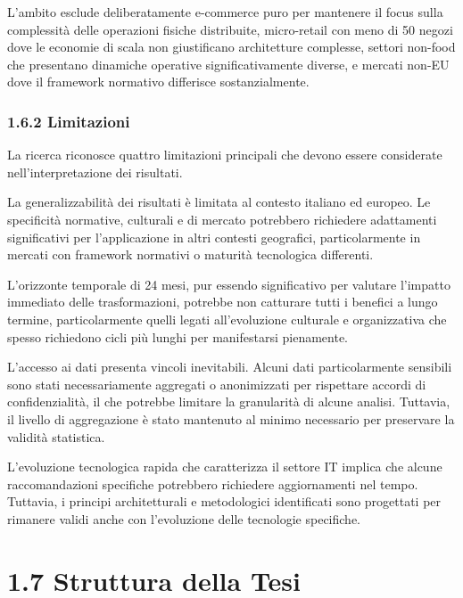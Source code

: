 \documentclass{report}
\begin{document}
L'ambito esclude deliberatamente e-commerce puro per mantenere il focus
sulla complessità delle operazioni fisiche distribuite, micro-retail con
meno di 50 negozi dove le economie di scala non giustificano
architetture complesse, settori non-food che presentano dinamiche
operative significativamente diverse, e mercati non-EU dove il framework
normativo differisce sostanzialmente.

\subsubsection{\texorpdfstring{\textbf{1.6.2
Limitazioni}}{1.6.2 Limitazioni}}\label{limitazioni}

La ricerca riconosce quattro limitazioni principali che devono essere
considerate nell'interpretazione dei risultati.

La generalizzabilità dei risultati è limitata al contesto italiano ed
europeo. Le specificità normative, culturali e di mercato potrebbero
richiedere adattamenti significativi per l'applicazione in altri
contesti geografici, particolarmente in mercati con framework normativi
o maturità tecnologica differenti.

L'orizzonte temporale di 24 mesi, pur essendo significativo per valutare
l'impatto immediato delle trasformazioni, potrebbe non catturare tutti i
benefici a lungo termine, particolarmente quelli legati all'evoluzione
culturale e organizzativa che spesso richiedono cicli più lunghi per
manifestarsi pienamente.

L'accesso ai dati presenta vincoli inevitabili. Alcuni dati
particolarmente sensibili sono stati necessariamente aggregati o
anonimizzati per rispettare accordi di confidenzialità, il che potrebbe
limitare la granularità di alcune analisi. Tuttavia, il livello di
aggregazione è stato mantenuto al minimo necessario per preservare la
validità statistica.

L'evoluzione tecnologica rapida che caratterizza il settore IT implica
che alcune raccomandazioni specifiche potrebbero richiedere
aggiornamenti nel tempo. Tuttavia, i principi architetturali e
metodologici identificati sono progettati per rimanere validi anche con
l'evoluzione delle tecnologie specifiche.

\section{\texorpdfstring{\textbf{1.7 Struttura della
Tesi}}{1.7 Struttura della Tesi}}\label{struttura-della-tesi}
\end{document}

